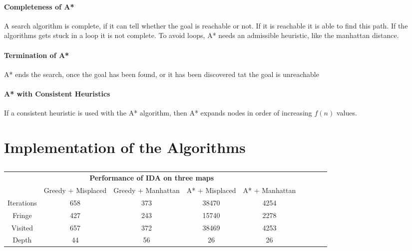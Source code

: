 \documentclass[a4paper,headsepline,12pt]{scrartcl}
\begin{document}
\paragraph{Completeness of A*} A search algorithm is complete, if it can tell whether the goal is reachable or not. If it is reachable it is able to find this path. If the algorithms gets stuck in a loop it is not complete. To avoid loops, A* needs an admissible heuristic, like the manhattan distance. 
\paragraph{Termination of A*} A* ends the search, once the goal has been found, or it has been discovered tat the goal is unreachable
\paragraph{A* with Consistent Heuristics}
If a consistent heuristic is used with the A* algorithm, then A* expands nodes in order of increasing \(f(n)\) values.


\section{Implementation of the Algorithms}

\begin{table} [ht!]                                             
\centering                                                
\begin{tabular}{|c|c|c|c|c|c|c|c|c|}    

\multicolumn{5}{c}{ \textbf{Performance of IDA on three maps}}   \\                                           
\cline{1-5}                                                    
\multicolumn{1}{|c|}{} & Greedy + Misplaced & Greedy + Manhattan & A* + Misplaced & A* + Manhattan   \\
\hline                                                    
Iterations & 658 & 373 & 38470 & 4254 \\ 
\hline                                                         
Fringe & 427 & 243 & 15740 & 2278\\
\hline                                                         
Visited & 657 & 372 & 38469 & 4253 \\ 
\hline
Depth & 44 & 56 & 26 & 26 \\ 
\hline
                                                 
\end{tabular}                                             
\caption{}                                  
\label{table:maps}                                
\end{table}  
\end{document}
